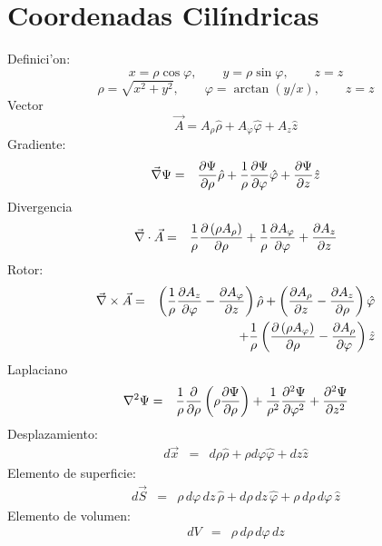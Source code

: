 \section{Coordenadas Cilíndricas}
Definici'on:
\begin{equation}
    x  =  \rho\cos\varphi , \qquad
    y  =  \rho\sin\varphi , \qquad
    z =  z
\end{equation}
\begin{equation}
    \rho  =  \sqrt{x^2 + y^2} , \qquad
    \varphi  = \arctan{(y/x)}, \qquad
     z=  z
\end{equation}
Vector
\begin{equation}
\vec{A} =A_\rho {\hat \rho} + A_\varphi {\hat \varphi} +
A_z {\hat z}
\end{equation}
Gradiente:
\begin{eqnarray}
 \vec\nabla\Psi&=&{\partial\Psi\over \partial \rho} {\hat \rho}
  + {1 \over \rho}{\partial\Psi\over \partial \varphi} {\hat \varphi}
  + {\partial\Psi\over \partial z} {\hat z}
\end{eqnarray}
Divergencia
\begin{eqnarray}
 \vec\nabla \cdot \vec{A}
&=&  {1 \over \rho}{\partial \left( \rho A_\rho  \right) \over \partial
\rho}  + {1 \over \rho}{\partial A_\varphi \over \partial \varphi}
  + {\partial A_z \over \partial z}
\end{eqnarray}
Rotor:
\begin{eqnarray}
\vec\nabla \times  \vec{A}
&=&   \left({1 \over \rho}{\partial A_z \over \partial \varphi}
    - {\partial A_\varphi \over \partial z}\right)  {\hat \rho} +
\left({\partial A_\rho \over \partial z} - {\partial A_z \over
\partial \rho}\right)  {\hat \varphi} \nonumber\\
&&+  {1 \over \rho}\left({\partial \left( \rho A_\varphi \right) \over
\partial \rho}     - {\partial A_\rho \over \partial \varphi}\right) {\hat z}
\end{eqnarray}
Laplaciano
\begin{eqnarray}
 \nabla^2 \Psi
&=& {1 \over \rho}{\partial \over \partial \rho}\left(\rho {\partial\Psi\over
\partial \rho}\right)
  + {1 \over \rho^2}{\partial^2\Psi\over \partial \varphi^2}
  + {\partial^2\Psi\over \partial z^2} \\
\end{eqnarray}
Desplazamiento:
\begin{eqnarray}
 d \vec{x}
 &=& d\rho {\hat \rho} + \rho d\varphi {\hat \varphi} +dz {\hat z}
\end{eqnarray}
Elemento de superficie:
\begin{eqnarray}
 d \vec{S}
&=& \rho\, d\varphi\, dz\, {\hat \rho} + d\rho
\,dz\, {\hat \varphi} +  \rho \,d\rho\, d\varphi \, {\hat z}
\end{eqnarray}
Elemento de volumen:
\begin{eqnarray}
 dV
 &=& \rho\, d\rho\, d\varphi\, dz
\end{eqnarray}

